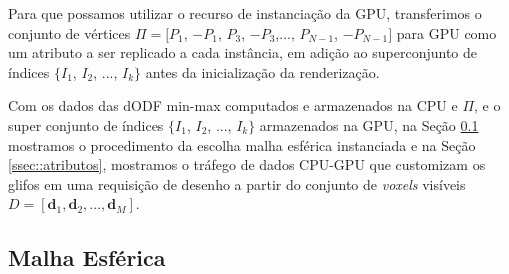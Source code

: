 




Para que possamos utilizar o recurso de instanciação da GPU, transferimos o conjunto de vértices $\Pi = [
  P_1$,
$-P_1$,
$ P_3$,
$-P_3$,...,
$ P_{N-1}$,
$-P_{N-1}]$ para GPU como um atributo a ser replicado a cada instância, em adição ao superconjunto de índices $\{I_1$, $I_2$, ..., $I_k\}$ antes da inicialização da renderização.

Com os dados das dODF min-max computados e armazenados na CPU e $\Pi$, e o super conjunto de índices $\{I_1$, $I_2$, ..., $I_k\}$ armazenados na GPU, na Seção \ref{malha_esferica} mostramos o procedimento da escolha malha esférica instanciada e na Seção \ref{ssec::atributos}, mostramos o tráfego de dados CPU-GPU que customizam os glifos em uma requisição de desenho a partir do conjunto de \textit{voxels} visíveis $D = [
\mathbf{d}_1,
\mathbf{d}_2, ..., 
\mathbf{d}_M
]$.



\subsection{Malha Esférica}
\label{malha_esferica}

